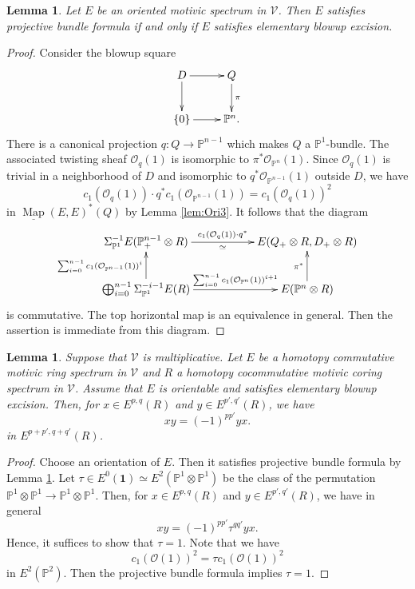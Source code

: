 \documentclass{amsart}
\theoremstyle{plain}
\newtheorem{lemma}[theorem]{Lemma}
\theoremstyle{definition}
\theoremstyle{remark}
\numberwithin{equation}{theorem}
\newcommand{\mcal}[1]{\mathcal{#1}}
\newcommand{\mbb}[1]{\mathbb{#1}}
\newcommand{\mbf}[1]{\mathbf{#1}}
\newcommand{\V}{\mathcal{V}}
\newcommand{\SigmaP}{\Sigma_{\mathbb{P}^1}}
\newcommand{\Map}{\operatorname{Map}}
\newcommand{\intMap}{\underline{\Map}}
\begin{document}
\begin{lemma}\label{lem:EBE2}
Let $E$ be an oriented motivic spectrum in $\V$.
Then $E$ satisfies projective bundle formula if and only if $E$ satisfies elementary blowup excision.
\end{lemma}
\begin{proof}
Consider the blowup square
\[
\xymatrix{
	D \ar[r] \ar[d] & Q \ar[d]^\pi \\
	\{0\} \ar[r] & \mbb{P}^n.
}
\]
There is a canonical projection $q\colon Q\to\mbb{P}^{n-1}$ which makes $Q$ a $\mbb{P}^1$-bundle.
The associated twisting sheaf $\mcal{O}_q(1)$ is isomorphic to $\pi^*\mcal{O}_{\mbb{P}^n}(1)$.
Since $\mcal{O}_q(1)$ is trivial in a neighborhood of $D$ and isomorphic to $q^*\mcal{O}_{\mbb{P}^{n-1}}(1)$ outside $D$, we have
\[
	c_1(\mcal{O}_q(1))\cdot q^*c_1(\mcal{O}_{\mbb{P}^{n-1}}(1)) = c_1(\mcal{O}_q(1))^2
\]
in $\intMap(E,E)^*(Q)$ by Lemma \ref{lem:Ori3}.
It follows that the diagram
\[
\xymatrix@C+2.5pc{
	\SigmaP^{-1}E(\mbb{P}^{n-1}_+\otimes R) \ar[r]^-{c_1(\mcal{O}_q(1))\cdot q^*}_-\simeq & E(Q_+\otimes R,D_+\otimes R) \\
	\bigoplus_{i=0}^{n-1}\SigmaP^{-i-1}E(R) \ar[u]^{\sum_{i=0}^{n-1}c_1(\mcal{O}_{\mbb{P}^{n-1}}(1))^i}
		\ar[r]^-{\sum_{i=0}^{n-1}c_1(\mcal{O}_{\mbb{P}^n}(1))^{i+1}} & E(\mbb{P}^n\otimes R) \ar[u]^{\pi^*}
}
\]
is commutative.
The top horizontal map is an equivalence in general.
Then the assertion is immediate from this diagram.
\end{proof}

\begin{lemma}\label{lem:EBE3}
Suppose that $\V$ is multiplicative.
Let $E$ be a homotopy commutative motivic ring spectrum in $\V$ and $R$ a homotopy cocommutative motivic coring spectrum in $\V$.
Assume that $E$ is orientable and satisfies elementary blowup excision.
Then, for $x\in E^{p,q}(R)$ and $y\in E^{p',q'}(R)$, we have
\[
	xy = (-1)^{pp'}yx.
\]
in $E^{p+p',q+q'}(R)$.
\end{lemma}
\begin{proof}
Choose an orientation of $E$.
Then it satisfies projective bundle formula by Lemma \ref{lem:EBE2}.
Let $\tau\in E^0(\mbf{1})\simeq E^2(\mbb{P}^1\otimes\mbb{P}^1)$ be the class of the permutation $\mbb{P}^1\otimes\mbb{P}^1\to\mbb{P}^1\otimes\mbb{P}^1$.
Then, for $x\in E^{p,q}(R)$ and $y\in E^{p',q'}(R)$, we have in general
\[
	xy = (-1)^{pp'}\tau^{qq'}yx.
\]
Hence, it suffices to show that $\tau=1$.
Note that we have
\[
	c_1(\mcal{O}(1))^2 = \tau c_1(\mcal{O}(1))^2
\]
in $E^2(\mbb{P}^2)$.
Then the projective bundle formula implies $\tau=1$.
\end{proof}
\end{document}
